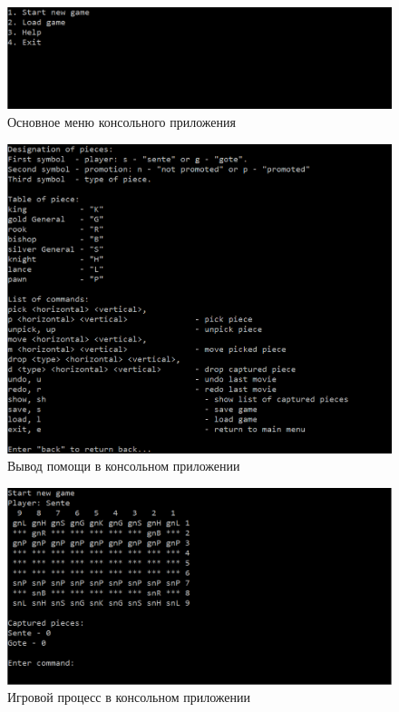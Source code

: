 \begin{figure}[H]
	\begin{center}
		\includegraphics[scale=0.7]{../screenshots/console_menu.png}
		\caption{Основное меню консольного приложения}
		\label{pic:console_menu}
	\end{center}
\end{figure}

\begin{figure}[H]
	\begin{center}
		\includegraphics[scale=0.7]{../screenshots/console_help.png}
		\caption{Вывод помощи в консольном приложении}
		\label{pic:console_help}
	\end{center}
\end{figure}

\begin{figure}[H]
	\begin{center}
		\includegraphics[scale=0.7]{../screenshots/console_game.png}
		\caption{Игровой процесс в консольном приложении}
		\label{pic:console_game}
	\end{center}
\end{figure}

